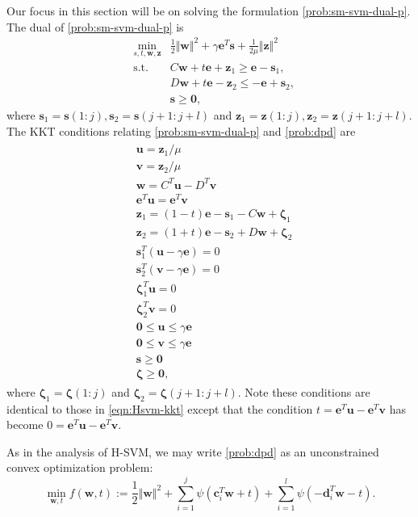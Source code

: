 \documentclass[twoside,11pt]{article}
\newcommand\bz{\bm{0}}
\newcommand{\bzeta}{\bm{\zeta}}
\renewcommand{\c}{\bm{c}}
\renewcommand{\d}{\bm{d}}
\newcommand\s{\bm{s}}
\renewcommand\u{\bm{u}}
\renewcommand\v{\bm{v}}
\newcommand\w{\bm{w}}
\newcommand\z{\bm{z}}
\newcommand\e{\bm{e}}
\begin{document}
Our focus in this section will be on solving the formulation \eqref{prob:sm-svm-dual-p}. The dual of \eqref{prob:sm-svm-dual-p} is
\begin{equation} \label{prob:dpd}
  \begin{array}{rrl}
    &\min_{s,t,\w,\z} & \frac{1}{2}\Vert\w\Vert^2 + \gamma\e^T\s+\frac{1}{2\mu}\Vert\z\Vert^2\\
    &\mbox{s.t.}& C\w+t\e+\z_1\ge \e-\s_1,\\
    &&D\w+t\e -\z_2\le -\e+\s_2,\\
    &&\s \geq \bz,
  \end{array}
\end{equation}
where $\s_1 = \s(1:j), \s_2 = \s(j+1:j+l)$ and $\z_1 = \z(1:j), \z_2 = \z(j+1:j+l)$. The KKT conditions relating \eqref{prob:sm-svm-dual-p} and \eqref{prob:dpd} are
\begin{align}
  \begin{split} \label{eqn:svm-kkt}
    &\u = \z_1/\mu\\
    &\v = \z_2/\mu\\
    &\w = C^T\u - D^T\v\\
    &\e^T\u = \e^T\v\\
    &\z_1 = (1-t)\e - \s_1 - C\w + \bzeta_1\\
    &\z_2 = (1+t)\e - \s_2 + D\w + \bzeta_2\\
    &\s_1^T(\u - \gamma\e) = 0\\
    &\s_2^T(\v - \gamma\e) = 0\\
    &\bzeta_1^T\u = 0\\
    &\bzeta_2^T\v = 0\\
    &\bz \leq \u \leq \gamma\e\\
    &\bz \leq \v \leq \gamma\e\\
    &\s \geq \bz\\
    &\bzeta \geq \bz,
  \end{split}
\end{align}
where $\bzeta_1 = \bzeta(1:j)$ and $\bzeta_2 = \bzeta(j+1:j+l)$. Note these conditions are identical to those in \eqref{eqn:Hsvm-kkt} except that the condition $t = \e^T\u - \e^T\v$ has become $0 = \e^T\u - \e^T\v$.

As in the analysis of H-SVM, we may write \eqref{prob:dpd} as an unconstrained convex optimization problem:
\begin{equation} \label{eqn:dpd}
  \min_{\w,t} f(\w,t):= \frac{1}{2}\Vert\w\Vert^2+\sum_{i=1}^j\psi(\c_i^T\w+t)+\sum_{i=1}^l\psi(-\d_i^T\w-t).
\end{equation}
\end{document}
